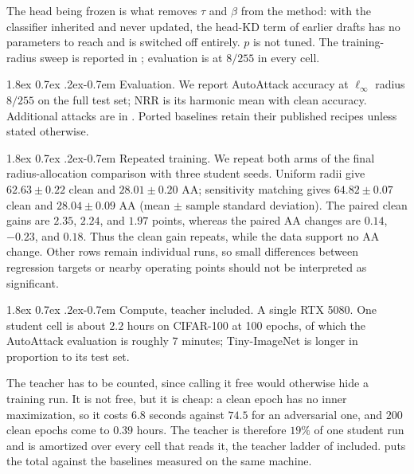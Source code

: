 \documentclass{article} %
\makeatletter
\theoremstyle{plain}
\renewcommand{\paragraph}{\@startsection{paragraph}{4}{\z@}%
  {1.8ex \@plus 0.7ex \@minus .2ex}{-0.7em}%
  {\normalfont\normalsize\bfseries}}
\makeatother
\begin{document}
The head being frozen is what removes $\tau$ and $\beta$ from the method: with the classifier
inherited and never updated, the head-KD term of earlier drafts has no parameters to reach and is
switched off entirely. $p$ is not tuned. The training-radius sweep is reported in
; evaluation is at $8/255$ in every cell.

\paragraph{Evaluation.} We report AutoAttack accuracy at $\ell_\infty$ radius $8/255$ on the full
test set; NRR is its harmonic mean with clean accuracy. Additional attacks are in
. Ported baselines retain their published recipes unless stated
otherwise.

\paragraph{Repeated training.} We repeat both arms of the final radius-allocation comparison with
three student seeds. Uniform radii give $62.63\pm0.22$ clean and $28.01\pm0.20$ AA; sensitivity
matching gives $64.82\pm0.07$ clean and $28.04\pm0.09$ AA (mean $\pm$ sample standard deviation).
The paired clean gains are $2.35$, $2.24$, and $1.97$ points, whereas the paired AA changes are
$0.14$, $-0.23$, and $0.18$. Thus the clean gain repeats, while the data support no AA change.
Other rows remain individual runs, so small differences between regression targets or nearby
operating points should not be interpreted as significant.

\paragraph{Compute, teacher included.} A single RTX 5080. One student cell is about $2.2$ hours on
CIFAR-100 at 100 epochs, of which the AutoAttack evaluation is roughly $7$ minutes; Tiny-ImageNet is
longer in proportion to its test set.

The teacher has to be counted, since calling it free would otherwise hide a training run. It is not
free, but it is cheap: a clean epoch has no inner maximization, so it costs $6.8$ seconds against
$74.5$ for an adversarial one, and $200$ clean epochs come to $0.39$ hours. The teacher is therefore
$19\%$ of one student run and is amortized over every cell that reads it, the teacher ladder of
 included.  puts the total against the baselines measured
on the same machine.
\end{document}

